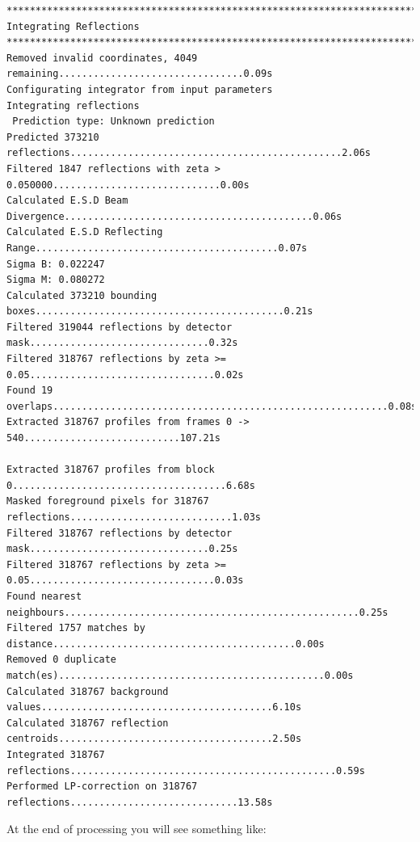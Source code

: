 \documentclass[a4paper, 11pt]{article}
\begin{document}
{\small
\begin{verbatim}
********************************************************************************
Integrating Reflections
********************************************************************************
Removed invalid coordinates, 4049 remaining................................0.09s
Configurating integrator from input parameters
Integrating reflections
 Prediction type: Unknown prediction
Predicted 373210 reflections...............................................2.06s
Filtered 1847 reflections with zeta > 0.050000.............................0.00s
Calculated E.S.D Beam Divergence...........................................0.06s
Calculated E.S.D Reflecting Range..........................................0.07s
Sigma B: 0.022247
Sigma M: 0.080272
Calculated 373210 bounding boxes...........................................0.21s
Filtered 319044 reflections by detector mask...............................0.32s
Filtered 318767 reflections by zeta >= 0.05................................0.02s
Found 19 overlaps..........................................................0.08s
Extracted 318767 profiles from frames 0 -> 540...........................107.21s

Extracted 318767 profiles from block 0.....................................6.68s
Masked foreground pixels for 318767 reflections............................1.03s
Filtered 318767 reflections by detector mask...............................0.25s
Filtered 318767 reflections by zeta >= 0.05................................0.03s
Found nearest neighbours...................................................0.25s
Filtered 1757 matches by distance..........................................0.00s
Removed 0 duplicate match(es)..............................................0.00s
Calculated 318767 background values........................................6.10s
Calculated 318767 reflection centroids.....................................2.50s
Integrated 318767 reflections..............................................0.59s
Performed LP-correction on 318767 reflections.............................13.58s
\end{verbatim}
}

At the end of processing you will see something like:
\end{document}
